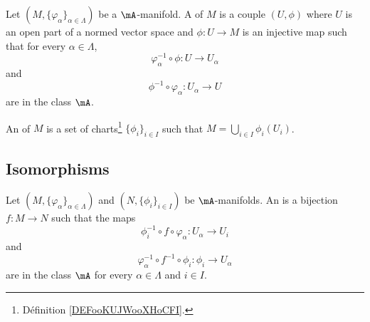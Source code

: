 \begin{definition}[Chart]		\label{DEFooKUJWooXHoCFI}
	Let \( (M,\{ \varphi_{\alpha} \}_{\alpha\in \Lambda})\) be a \( \mA\)-manifold. A  of \( M\) is a couple \( (U,\phi)\) where \( U\) is an open part of a normed vector space and \(\phi \colon U\to M  \) is an injective map such that for every \( \alpha\in \Lambda\),
	\begin{equation}
		\varphi_{\alpha}^{-1} \circ \phi\colon U \to U_{\alpha}
	\end{equation}
	and
	\begin{equation}
		\phi^{-1}\circ\varphi_{\alpha} \colon U_{\alpha}\to U
	\end{equation}
	are in the class \( \mA\).
\end{definition}

\begin{definition}	\label{DEFooKKDSooYjgZqa}
	An  of \( M\) is a set of charts\footnote{Définition \ref{DEFooKUJWooXHoCFI}.} \( \{ \phi_i \}_{i\in I}\) such that \( M=\bigcup_{i\in I}\phi_i(U_i)\).
\end{definition}


\subsection{Isomorphisms}

\begin{definition}	\label{DEFooZPUEooPcSxNs}
	Let \( (M,\{ \varphi_{\alpha} \}_{\alpha\in \Lambda})\) and \( (N,\{ \phi_i \}_{i\in I})\) be \( \mA\)-manifolds. An  is a bijection \(f \colon M\to N  \) such that the maps
	\begin{equation}		\label{EQooTGDUooWRDSrE}
		\phi_i^{-1}\circ f\circ \varphi_{\alpha} \colon U_{\alpha}\to U_i
	\end{equation}
	and
	\begin{equation}		\label{EQooCUARooRvbuPZ}
		\varphi_{\alpha}^{-1}\circ f^{-1}\circ\phi_i \colon \phi_i\to U_{\alpha}
	\end{equation}
	are in the class \( \mA\) for every \( \alpha\in\Lambda\) and \( i\in I\).
\end{definition}


